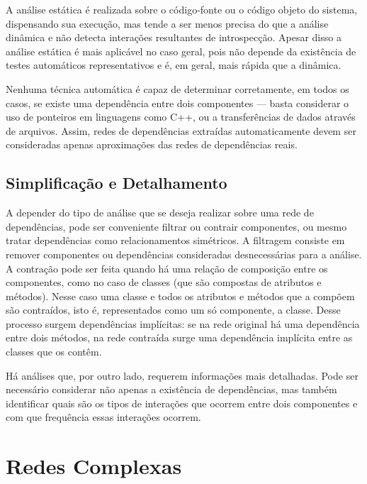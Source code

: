 ﻿\documentclass{article}
\begin{document}
A análise estática é realizada sobre o código-fonte ou o código objeto do sistema, dispensando sua execução, mas tende a ser menos precisa do que a análise dinâmica \cite{Landil1992} e não detecta interações resultantes de introspecção. Apesar disso a análise estática é mais aplicável no caso geral, pois não depende da existência de testes automáticos representativos e é, em geral, mais rápida que a dinâmica.

Nenhuma técnica automática é capaz de determinar corretamente, em todos os casos, se existe uma dependência entre dois componentes --- basta considerar o uso de ponteiros em linguagens como C++, ou a transferências de dados através de arquivos. Assim, redes de dependências extraídas automaticamente devem ser consideradas apenas aproximações das redes de dependências reais.

\subsection{Simplificação e Detalhamento}

A depender do tipo de análise que se deseja realizar sobre uma rede de dependências, pode ser conveniente filtrar ou contrair componentes, ou mesmo tratar dependências como relacionamentos simétricos. A filtragem consiste em remover componentes ou dependências consideradas desnecessárias para a análise. A contração pode ser feita quando há uma relação de composição entre os componentes, como no caso de classes (que são compostas de atributos e métodos). Nesse caso uma classe e todos os atributos e métodos que a compõem são contraídos, isto é, representados como um só componente, a classe. Desse processo surgem dependências implícitas: se na rede original há uma dependência entre dois métodos, na rede contraída surge uma dependência implícita entre as classes que os contêm. %

Há análises que, por outro lado, requerem informações mais detalhadas. Pode ser necessário considerar não apenas a existência de dependências, mas também identificar quais são os tipos de interações que ocorrem entre dois componentes e com que frequência essas interações ocorrem.

\section{Redes Complexas}
\end{document}
